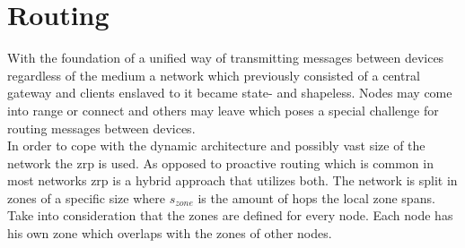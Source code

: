 \documentclass[a4paper]{report}
\begin{document}
	    \section{Routing}\label{ZRP}
	        With the foundation of a unified way of transmitting messages between devices regardless of the medium a network which previously consisted of a central gateway and clients enslaved to it became state- and shapeless. Nodes may come into range or connect and others may leave which poses a special challenge for routing messages between devices.\\
	        In order to cope with the dynamic architecture and possibly vast size of the network the \acrlong{zrp} \cite{zoneRoutingProtocol} is used. As opposed to proactive routing which is common in most networks \acrshort{zrp} is a hybrid approach that utilizes both. The network is split in zones of a specific size where $s_{zone}$ is the amount of hops the local zone spans. Take into consideration that the zones are defined for every node. Each node has his own zone which overlaps with the zones of other nodes.\\
	        \newpage
\end{document}
